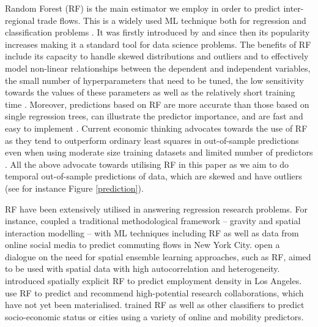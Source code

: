 \documentclass[]{interact}
\theoremstyle{plain}%
\theoremstyle{definition}
\theoremstyle{remark}
\begin{document}
Random Forest (RF) is the main estimator we employ in order to predict
inter-regional trade flows. This is a widely used ML technique both for
regression and classification problems \citep{biau2012analysis}. It was
firstly introduced by \citet{breiman2001random} and since then its
popularity increases making it a standard tool for data science
problems. The benefits of RF include its capacity to handle skewed
distributions and outliers and to effectively model non-linear
relationships between the dependent and independent variables, the small
number of hyperparameters that need to be tuned, the low sensitivity
towards the values of these parameters as well as the relatively short
training time \citep{Caruana2008, liaw2002classification, yan2020using}.
Moreover, predictions based on RF are more accurate than those based on
single regression trees, can illustrate the predictor importance, and
are fast and easy to implement
\citep{breiman2001random, sulaiman2011intelligent, pourebrahim2019trip, biau2012analysis}.
Current economic thinking advocates towards the use of RF as they tend
to outperform ordinary least squares in out-of-sample predictions even
when using moderate size training datasets and limited number of
predictors \citep{mullainathan2017machine, athey2019machine}. All the
above advocate towards utilising RF in this paper as we aim to do
temporal out-of-sample predictions of data, which are skewed and have
outliers (see for instance Figure \ref{prediction}).

RF have been extensively utilised in answering regression research
problems. For instance, \citet{pourebrahim2019trip} coupled a
traditional methodological framework -- gravity and spatial interaction
modelling -- with ML techniques including RF as well as data from online
social media to predict commuting flows in New York City.
\citet{sinha2019assessing} open a dialogue on the need for spatial
ensemble learning approaches, such as RF, aimed to be used with spatial
data with high autocorrelation and heterogeneity. \citet{creditspatial}
introduced spatially explicit RF to predict employment density in Los
Angeles. \citet{guns2014recommending} use RF to predict and recommend
high-potential research collaborations, which have not yet been
materialised. \citet{ren2019predicting} trained RF as well as other
classifiers to predict socio-economic status or cities using a variety
of online and mobility predictors.
\end{document}
